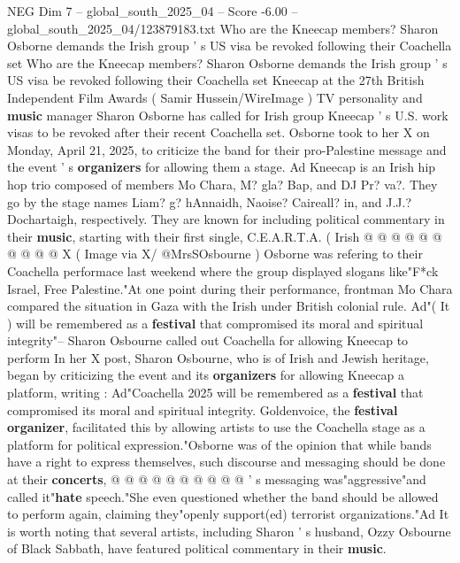 \begin{textsample}{NEG Dim 7 – global\_south\_2025\_04 – Score -6.00 – global\_south\_2025\_04/123879183.txt}  \label{ex:f7_neg_307}
Who are the Kneecap members?
Sharon Osborne demands the Irish group ' s US visa be revoked following their Coachella set Who are the Kneecap members?
Sharon Osborne demands the Irish group ' s US visa be revoked following their Coachella set Kneecap at the 27th British Independent Film Awards ( Samir Hussein/WireImage ) TV personality and \textbf{music} manager Sharon Osborne has called for Irish group Kneecap ' s U.S. work visas to be revoked after their recent Coachella set.
Osborne took to her X on Monday, April 21, 2025, to criticize the band for their pro-Palestine message and the event ' s \textbf{organizers} for allowing them a stage.
Ad Kneecap is an Irish hip hop trio composed of members Mo Chara, M? gla?
Bap, and DJ Pr? va?.
They go by the stage names Liam? g? hAnnaidh, Naoise?
Caireall? in, and J.J.?
Dochartaigh, respectively.
They are known for including political commentary in their \textbf{music}, starting with their first single, C.E.A.R.T.A. ( Irish @ @ @ @ @ @ @ @ @ @ X ( Image via X/ @MrsSOsbourne ) Osborne was refering to their Coachella performace last weekend where the group displayed slogans like"F*ck Israel, Free Palestine."At one point during their performance, frontman Mo Chara compared the situation in Gaza with the Irish under British colonial rule.
Ad"( It ) will be remembered as a \textbf{festival} that compromised its moral and spiritual integrity"-- Sharon Osbourne called out Coachella for allowing Kneecap to perform In her X post, Sharon Osbourne, who is of Irish and Jewish heritage, began by criticizing the event and its \textbf{organizers} for allowing Kneecap a platform, writing : Ad"Coachella 2025 will be remembered as a \textbf{festival} that compromised its moral and spiritual integrity.
Goldenvoice, the \textbf{festival} \textbf{organizer}, facilitated this by allowing artists to use the Coachella stage as a platform for political expression."Osborne was of the opinion that while bands have a right to express themselves, such discourse and messaging should be done at their \textbf{concerts}, @ @ @ @ @ @ @ @ @ @ ' s messaging was"aggressive"and called it"\textbf{hate} speech."She even questioned whether the band should be allowed to perform again, claiming they"openly support(ed) terrorist organizations."Ad It is worth noting that several artists, including Sharon ' s husband, Ozzy Osbourne of Black Sabbath, have featured political commentary in their \textbf{music}.

\end{textsample}
